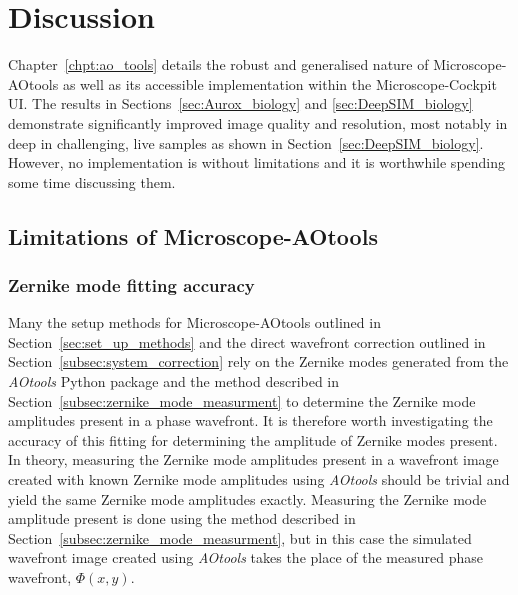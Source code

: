 \chapter{Discussion}

Chapter~\ref{chpt:ao_tools} details the robust and generalised nature of Microscope-AOtools as well as its accessible implementation within the Microscope-Cockpit UI. The results in Sections~\ref{sec:Aurox_biology} and \ref{sec:DeepSIM_biology} demonstrate significantly improved image quality and resolution, most notably in deep in challenging, live samples as shown in Section~\ref{sec:DeepSIM_biology}. However, no implementation is without limitations and it is worthwhile spending some time discussing them.

\section{Limitations of Microscope-AOtools}
\label{sec:limitations}

\subsection{Zernike mode fitting accuracy}
\label{subsec:zernike_accuracy}

Many the setup methods for Microscope-AOtools outlined in 
Section~\ref{sec:set_up_methods} and the direct wavefront correction 
outlined in Section~\ref{subsec:system_correction} rely on the Zernike 
modes generated from the \textit{AOtools} Python package and the method 
described in Section~\ref{subsec:zernike_mode_measurment} to determine the 
Zernike mode amplitudes present in a phase 
wavefront\cite{townson2019aotools}. It is therefore worth investigating the 
accuracy of this fitting for determining the amplitude of Zernike modes 
present. In theory, measuring the Zernike mode amplitudes present in a 
wavefront image created with known Zernike mode amplitudes using 
\textit{AOtools} should be trivial and yield the same Zernike mode amplitudes 
exactly. Measuring the Zernike mode amplitude present is done using the 
method described in Section~\ref{subsec:zernike_mode_measurment}, but in this 
case the simulated wavefront image created using \textit{AOtools} takes the 
place of the measured phase wavefront, $\Phi(x,y)$. 


